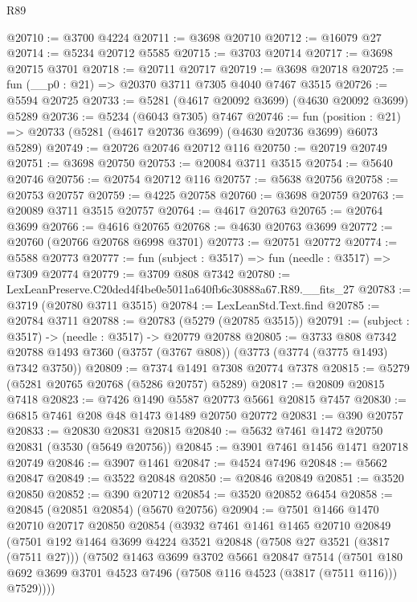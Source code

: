\begin{lexlean}{R89}
\begin{coremodule}
@20710 := @3700 @4224
@20711 := @3698 @20710
@20712 := @16079 @27
@20714 := @5234 @20712 @5585
@20715 := @3703 @20714
@20717 := @3698 @20715 @3701
@20718 := @20711 @20717
@20719 := @3698 @20718
@20725 := fun (__p0 : @21) => @20370 @3711 @7305 @4040 @7467 @3515
@20726 := @5594 @20725
@20733 := @5281 (@4617 @20092 @3699) (@4630 @20092 @3699) @5289
@20736 := @5234 (@6043 @7305) @7467
@20746 := fun (position : @21) =>
  @20733 (@5281 (@4617 @20736 @3699) (@4630 @20736 @3699) @6073 @5289)
@20749 := @20726 @20746 @20712 @116
@20750 := @20719 @20749
@20751 := @3698 @20750
@20753 := @20084 @3711 @3515
@20754 := @5640 @20746
@20756 := @20754 @20712 @116
@20757 := @5638 @20756
@20758 := @20753 @20757
@20759 := @4225 @20758
@20760 := @3698 @20759
@20763 := @20089 @3711 @3515 @20757
@20764 := @4617 @20763
@20765 := @20764 @3699
@20766 := @4616 @20765
@20768 := @4630 @20763 @3699
@20772 := @20760 (@20766 @20768 @6998 @3701)
@20773 := @20751 @20772
@20774 := @5588 @20773
@20777 := fun (subject : @3517) => fun (needle : @3517) => @7309 @20774
@20779 := @3709 @808 @7342
@20780 := LexLeanPreserve.C20ded4f4be0e5011a640fb6c30888a67.R89.__fits_27
@20783 := @3719 (@20780 @3711 @3515)
@20784 := LexLeanStd.Text.find
@20785 := @20784 @3711
@20788 := @20783 (@5279 (@20785 @3515))
@20791 := (subject : @3517) -> (needle : @3517) -> @20779 @20788
@20805 := @3733
    @808
    @7342
    @20788
    @1493
    @7360
    (@3757 (@3767 @808))
    (@3773 (@3774 (@3775 @1493) @7342 @3750))
@20809 := @7374 @1491 @7308 @20774 @7378
@20815 := @5279 (@5281 @20765 @20768 (@5286 @20757) @5289)
@20817 := @20809 @20815 @7418
@20823 := @7426 @1490 @5587 @20773 @5661 @20815 @7457
@20830 := @6815 @7461 @208 @48 @1473 @1489 @20750 @20772
@20831 := @390 @20757
@20833 := @20830 @20831 @20815
@20840 := @5632 @7461 @1472 @20750 @20831 (@3530 (@5649 @20756))
@20845 := @3901 @7461 @1456 @1471 @20718 @20749
@20846 := @3907 @1461
@20847 := @4524 @7496
@20848 := @5662 @20847
@20849 := @3522 @20848
@20850 := @20846 @20849
@20851 := @3520 @20850
@20852 := @390 @20712
@20854 := @3520 @20852 @6454
@20858 := @20845 (@20851 @20854) (@5670 @20756)
@20904 := @7501
    @1466
    @1470
    @20710
    @20717
    @20850
    @20854
    (@3932
      @7461
      @1461
      @1465
      @20710
      @20849
      (@7501
        @192
        @1464
        @3699
        @4224
        @3521
        @20848
        (@7508 @27 @3521 (@3817 (@7511 @27)))
        (@7502
          @1463
          @3699
          @3702
          @5661
          @20847
          @7514
          (@7501 @180 @692 @3699 @3701 @4523 @7496 (@7508 @116 @4523 (@3817 (@7511 @116))) @7529))))

\end{coremodule}
\end{lexlean}
